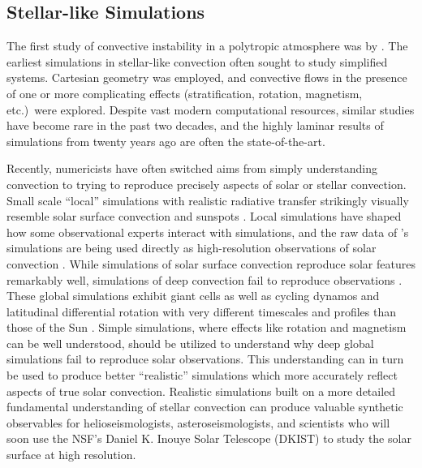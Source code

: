 \subsection{Stellar-like Simulations}
The first study of convective instability in a polytropic atmosphere was by \citet{unnoetall1960}.
The earliest simulations in stellar-like convection \citep{graham1975, hurlburt&all1984, cattaneo&all1991, brummell&all1996, brummell&all1998} often sought to study simplified systems.
Cartesian geometry was employed, and convective flows in the presence of one or more complicating effects (stratification, rotation, magnetism, etc.)~were explored.
Despite vast modern computational resources, similar studies \cite[e.g.,][]{wood&brummell2012, anders&brown2017, wood&brummell2018} have become rare in the past two decades, and the highly laminar results of simulations from twenty years ago are often the state-of-the-art.

Recently, numericists have often switched aims from simply understanding convection to trying to reproduce precisely aspects of solar or stellar convection.
Small scale ``local'' simulations with realistic radiative transfer strikingly visually resemble solar surface convection and sunspots \citep{stein&nordlund1998, rempel&all2009, stein&nordlund2012, rempel2014}.
Local simulations have shaped how some observational experts interact with simulations, and the raw data of \cite{rempel2014}'s simulations are being used directly as high-resolution observations of solar convection \cite[see e.g.,][and others]{vankooten&cranmer2017, shchukina&trujillo2019}.
While simulations of solar surface convection reproduce solar features remarkably well, simulations of deep convection fail to reproduce observations  \citep{hanasoge&all2015}.
These global simulations exhibit giant cells as well as cycling dynamos and latitudinal differential rotation with very different timescales and profiles than those of the Sun \citep{brown&all2010, brown&all2011, guerrero&all2016, hotta&all2016, brun&all2017, strugarek&all2018}.
Simple simulations, where effects like rotation and magnetism can be well understood, should be utilized to understand why deep global simulations fail to reproduce solar observations.
This understanding can in turn be used to produce better ``realistic'' simulations which more accurately reflect aspects of true solar convection.
Realistic simulations built on a more detailed fundamental understanding of stellar convection can produce valuable synthetic observables for helioseismologists, asteroseismologists, and scientists who will soon use the NSF's Daniel K. Inouye Solar Telescope (DKIST) to study the solar surface at high resolution.


